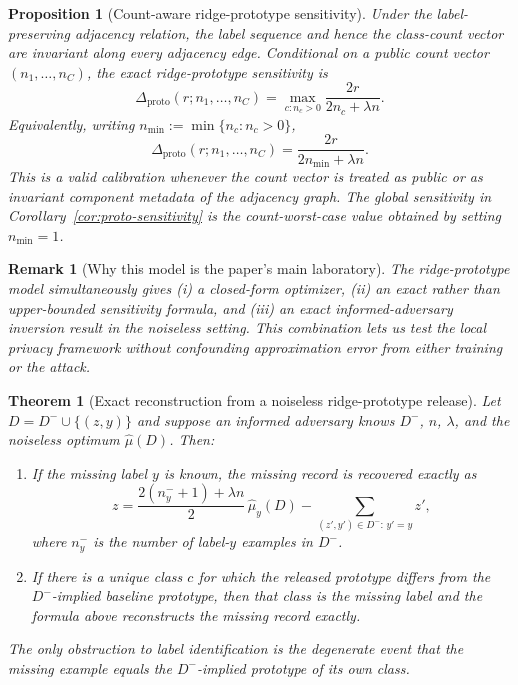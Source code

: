 \documentclass[conference,compsoc]{IEEEtran}
\newtheorem{theorem}{Theorem}
\newtheorem{proposition}{Proposition}
\newtheorem{remark}{Remark}
\begin{document}
\begin{proposition}[Count-aware ridge-prototype sensitivity]
\label{prop:proto-count-aware-sensitivity}
Under the label-preserving adjacency relation, the label sequence and hence the class-count vector are invariant along every adjacency edge. Conditional on a public count vector $(n_1,\ldots,n_C)$, the exact ridge-prototype sensitivity is
\[
\Delta_{\mathrm{proto}}(r;n_1,\ldots,n_C)
=
\max_{c:n_c>0}\frac{2r}{2n_c+\lambda n}.
\]
Equivalently, writing $n_{\min}:=\min\{n_c:n_c>0\}$,
\[
\Delta_{\mathrm{proto}}(r;n_1,\ldots,n_C)
=
\frac{2r}{2n_{\min}+\lambda n}.
\]
This is a valid calibration whenever the count vector is treated as public or as invariant component metadata of the adjacency graph. The global sensitivity in Corollary~\ref{cor:proto-sensitivity} is the count-worst-case value obtained by setting $n_{\min}=1$.
\end{proposition}


\begin{remark}[Why this model is the paper's main laboratory]
The ridge-prototype model simultaneously gives (i) a closed-form optimizer, (ii) an exact rather than upper-bounded sensitivity formula, and (iii) an exact informed-adversary inversion result in the noiseless setting. This combination lets us test the local privacy framework without confounding approximation error from either training or the attack.
\end{remark}

\begin{theorem}[Exact reconstruction from a noiseless ridge-prototype release]
\label{thm:proto-exact-recon}
Let $D=D^-\cup\{(z,y)\}$ and suppose an informed adversary knows $D^-$, $n$, $\lambda$, and the noiseless optimum $\widehat\mu(D)$. Then:
\begin{enumerate}[leftmargin=1.4em]
    \item If the missing label $y$ is known, the missing record is recovered exactly as
    \[
    z=\frac{2(n_y^-+1)+\lambda n}{2}\,\widehat\mu_y(D)-\sum_{(z',y')\in D^-:\,y'=y} z',
    \]
    where $n_y^-$ is the number of label-$y$ examples in $D^-$.
    \item If there is a unique class $c$ for which the released prototype differs from the $D^-$-implied baseline prototype,
    then that class is the missing label and the formula above reconstructs the missing record exactly.
\end{enumerate}
The only obstruction to label identification is the degenerate event that the missing example equals the $D^-$-implied prototype of its own class.
\end{theorem}
\end{document}
